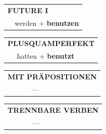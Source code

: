 \documentclass[10pt,a4paper]{revtex4-2}
\begin{document}
\begin{verbbox-acc}
\begin{tabular}{rl}
    \multicolumn{2}{l}{\textbf{FUTURE I} }\\
   & werden + \textbf{benutzen}\\
 
  \end{tabular}
\hfill
   \begin{tabular}{rl}
      \multicolumn{2}{l}{\textbf{PLUSQUAMPERFEKT}}\\
   & hatten + \textbf{benutzt}\\
  \end{tabular}
  
  \vspace{-5pt}\vspace{10pt}

\begin{tabular}{lll}
\multicolumn{3}{l}{\textbf{MIT PRÄPOSITIONEN}}\\
& ---\\
\end{tabular}
\hfill
\begin{tabular}{lll}
\multicolumn{3}{l}{\textbf{TRENNBARE VERBEN}}\\
& ---\\
\end{tabular}

\vspace{-5pt}

\end{verbbox-acc}
\end{document}
